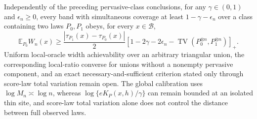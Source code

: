 Independently of the preceding pervasive-class conclusions, for any \(\gamma\in(0,1)\) and \(\epsilon_n\ge0\), every band with simultaneous coverage at least \(1-\gamma-\epsilon_n\) over a class containing two laws \(P_0,P_1\) obeys, for every \(x\in\mathcal B\),
\[
 \mathbb E_{P_0}W_n(x)\ge\frac{|\tau_{P_1}(x)-\tau_{P_0}(x)|}{2}
 \left[1-2\gamma-2\epsilon_n-
 \operatorname{TV}(P_0^{\otimes n},P_1^{\otimes n})\right]_+.
\]
Uniform local-oracle width achievability over an arbitrary triangular union, the corresponding local-ratio converse for unions without a nonempty pervasive component, and an exact necessary-and-sufficient criterion stated only through score-law total variation remain open. The global calibration uses \(\log M_n\asymp\log n\), whereas \(\log\{eK_P(x,h)/\gamma\}\) can remain bounded at an isolated thin site, and score-law total variation alone does not control the distance between full observed laws.